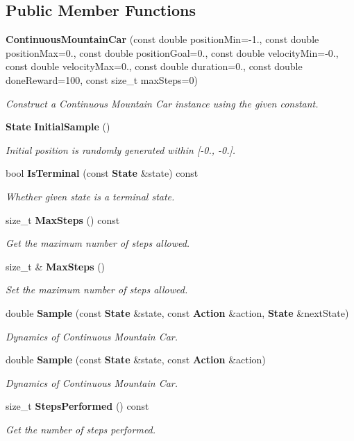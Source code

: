 \subsection*{Public Member Functions}
\begin{DoxyCompactItemize}
\item 
\textbf{ Continuous\+Mountain\+Car} (const double position\+Min=-\/1., const double position\+Max=0., const double position\+Goal=0., const double velocity\+Min=-\/0., const double velocity\+Max=0., const double duration=0., const double done\+Reward=100, const size\+\_\+t max\+Steps=0)
\begin{DoxyCompactList}\small\item\em Construct a Continuous Mountain Car instance using the given constant. \end{DoxyCompactList}\item 
\textbf{ State} \textbf{ Initial\+Sample} ()
\begin{DoxyCompactList}\small\item\em Initial position is randomly generated within [-\/0., -\/0.]. \end{DoxyCompactList}\item 
bool \textbf{ Is\+Terminal} (const \textbf{ State} \&state) const
\begin{DoxyCompactList}\small\item\em Whether given state is a terminal state. \end{DoxyCompactList}\item 
size\+\_\+t \textbf{ Max\+Steps} () const
\begin{DoxyCompactList}\small\item\em Get the maximum number of steps allowed. \end{DoxyCompactList}\item 
size\+\_\+t \& \textbf{ Max\+Steps} ()
\begin{DoxyCompactList}\small\item\em Set the maximum number of steps allowed. \end{DoxyCompactList}\item 
double \textbf{ Sample} (const \textbf{ State} \&state, const \textbf{ Action} \&action, \textbf{ State} \&next\+State)
\begin{DoxyCompactList}\small\item\em Dynamics of Continuous Mountain Car. \end{DoxyCompactList}\item 
double \textbf{ Sample} (const \textbf{ State} \&state, const \textbf{ Action} \&action)
\begin{DoxyCompactList}\small\item\em Dynamics of Continuous Mountain Car. \end{DoxyCompactList}\item 
size\+\_\+t \textbf{ Steps\+Performed} () const
\begin{DoxyCompactList}\small\item\em Get the number of steps performed. \end{DoxyCompactList}\end{DoxyCompactItemize}


